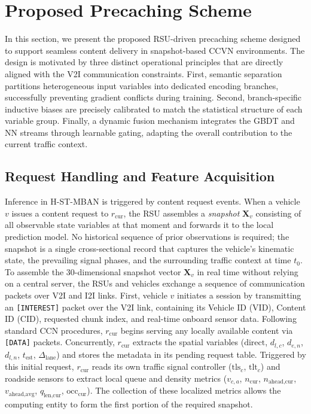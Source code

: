 \documentclass[journal]{IEEEtran}
\begin{document}
\section{Proposed Precaching Scheme}\label{sec:architecture}

In this section, we present the proposed RSU-driven precaching scheme designed to support seamless content delivery in snapshot-based CCVN environments.
The design is motivated by three distinct operational principles that are directly aligned with the V2I communication constraints.
First, semantic separation partitions heterogeneous input variables into dedicated encoding branches, successfully preventing gradient conflicts during training.
Second, branch-specific inductive biases are precisely calibrated to match the statistical structure of each variable group.
Finally, a dynamic fusion mechanism integrates the GBDT and NN streams through learnable gating, adapting the overall contribution to the current traffic context.

\subsection{Request Handling and Feature Acquisition}
\label{sec.net.B}

Inference in H-ST-MBAN is triggered by content request events.
When a vehicle $v$ issues a content request to $r_{\text{cur}}$, the RSU
assembles a \emph{snapshot} $\mathbf{X}_v$ consisting of all observable
state variables at that moment and forwards it to the local prediction model.
No historical sequence of prior observations is required; the snapshot is a single
cross-sectional record that captures the vehicle's kinematic state, the prevailing
signal phases, and the surrounding traffic context at time $t_0$.
To assemble the 30-dimensional snapshot vector $\mathbf{X}_v$ in real time without relying on a central server, the RSUs and vehicles exchange a sequence of communication packets over V2I and I2I links.
First, vehicle $v$ initiates a session by transmitting an \texttt{[INTEREST]} packet over the V2I link, containing its Vehicle ID (VID), Content ID (CID), requested chunk index, and real-time onboard sensor data.
Following standard CCN procedures, $r_{\text{cur}}$ begins serving any locally available content via \texttt{[DATA]} packets.
Concurrently, $r_{\text{cur}}$ extracts the spatial variables ($\text{direct}$, $d_{l,c}$, $d_{e,n}$, $d_{l,n}$, $t_{\text{est}}$, $\Delta_{\text{lane}}$) and stores the metadata in its pending request table.
Triggered by this initial request, $r_{\text{cur}}$ reads its own traffic signal controller ($\text{tls}_c$, $\text{tlt}_c$) and roadside sensors to extract local queue and density metrics ($v_{c,a}$, $n_{\text{cur}}$, $n_{\text{ahead,cur}}$, $v_{\text{ahead,avg}}$, $q_{\text{len,cur}}$, $\text{occ}_{\text{cur}}$).
The collection of these localized metrics allows the computing entity to form the first portion of the required snapshot.
\end{document}
